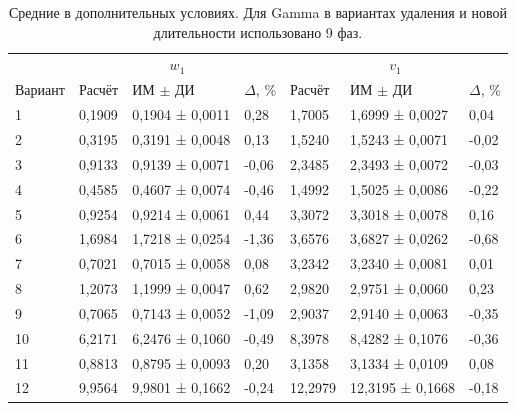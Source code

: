 \documentclass[a4paper,12pt]{article}
\begin{document}
\begin{table}[!htbp]
\centering\small\setlength{\tabcolsep}{2pt}
\begin{tabular}{@{}p{4.16cm}p{1.61cm}p{2.83cm}p{1.28cm}p{1.61cm}p{2.83cm}p{1.28cm}@{}}
\toprule
 & \multicolumn{3}{c}{$w_1$} & \multicolumn{3}{c}{$v_1$} \\
Вариант & Расчёт & ИМ $\pm$ ДИ & $\Delta$, \% & Расчёт & ИМ $\pm$ ДИ & $\Delta$, \% \\
\midrule
1 & 0,1909 & 0,1904 ± 0,0011 & 0,28 & 1,7005 & 1,6999 ± 0,0027 & 0,04 \\
2 & 0,3195 & 0,3191 ± 0,0048 & 0,13 & 1,5240 & 1,5243 ± 0,0071 & -0,02 \\
3 & 0,9133 & 0,9139 ± 0,0071 & -0,06 & 2,3485 & 2,3493 ± 0,0072 & -0,03 \\
4 & 0,4585 & 0,4607 ± 0,0074 & -0,46 & 1,4992 & 1,5025 ± 0,0086 & -0,22 \\
5 & 0,9254 & 0,9214 ± 0,0061 & 0,44 & 3,3072 & 3,3018 ± 0,0078 & 0,16 \\
6 & 1,6984 & 1,7218 ± 0,0254 & -1,36 & 3,6576 & 3,6827 ± 0,0262 & -0,68 \\
7 & 0,7021 & 0,7015 ± 0,0058 & 0,08 & 3,2342 & 3,2340 ± 0,0081 & 0,01 \\
8 & 1,2073 & 1,1999 ± 0,0047 & 0,62 & 2,9820 & 2,9751 ± 0,0060 & 0,23 \\
9 & 0,7065 & 0,7143 ± 0,0052 & -1,09 & 2,9037 & 2,9140 ± 0,0063 & -0,35 \\
10 & 6,2171 & 6,2476 ± 0,1060 & -0,49 & 8,3978 & 8,4282 ± 0,1076 & -0,36 \\
11 & 0,8813 & 0,8795 ± 0,0093 & 0,20 & 3,1358 & 3,1334 ± 0,0109 & 0,08 \\
12 & 9,9564 & 9,9801 ± 0,1662 & -0,24 & 12,2979 & 12,3195 ± 0,1668 & -0,18 \\
\bottomrule
\end{tabular}
\caption{Средние в дополнительных условиях. Для Gamma в вариантах удаления и новой длительности использовано 9 фаз.}
\label{tab:studymeans}
\end{table}
\end{document}
